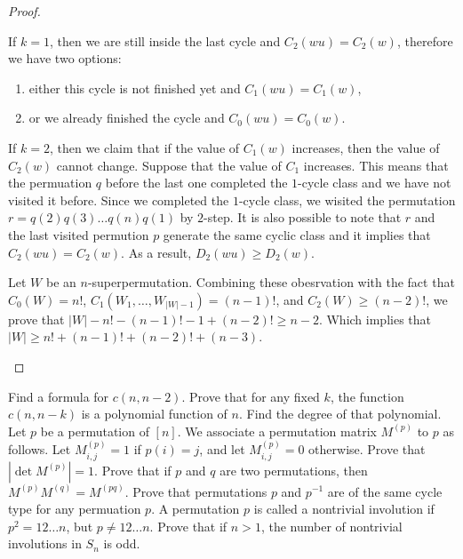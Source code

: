 \begin{proof}
\begin{itemize}
      If $k = 1$, then we are still
      inside the last cycle and $C_2(wu) = C_2(w)$, therefore we have two
      options:
      \begin{enumerate}
        \item either this cycle is not finished yet and $C_1(wu) = C_1(w)$,
        \item or we already finished the cycle and $C_0(wu) = C_0(w)$.
      \end{enumerate}

      If $k = 2$, then we claim that if the value of $C_1(w)$ increases, then
      the value of $C_2(w)$ cannot change. Suppose that the value of $C_1$
      increases. This means that the permuation $q$ before the last one
      completed the $1$-cycle class and we have not visited it before. Since we
      completed the $1$-cycle class, we wisited the permutation $r = q(2) q(3)
      \dots q(n) q(1)$ by $2$-step. It is also possible to note that $r$ and
      the last visited permution $p$ generate the same cyclic class and it
      implies that $C_2(wu) = C_2(w)$.
      As a result, $D_2(wu) \ge D_2(w)$.

      Let $W$ be an $n$-superpermutation. Combining these obesrvation with the
      fact that $C_0(W) = n!$, $C_1(W_1, \dots, W_{|W| - 1}) = (n - 1)!$, and
      $C_2(W) \ge (n - 2)!$, we prove that
      $|W| - n! - (n - 1)! - 1  + (n - 2)! \ge n - 2$. Which implies that
      $|W| \ge n! + (n - 1)! + (n - 2)! + (n - 3)$.
  \end{itemize}
\end{proof}
\begin{chapterendexercises}
  \exercise Find a formula for $c(n, n - 2)$.
  \exercise Prove that for any fixed $k$, the function $c(n, n - k)$ is a
    polynomial function of $n$. Find the degree of that polynomial.
  \exercise Let $p$ be a permutation of $[n]$. We associate a permutation matrix
    $M^{(p)}$ to $p$ as follows. Let $M^{(p)}_{i, j} = 1$ if $p(i) = j$, and let
    $M^{(p)}_{i, j} = 0$ otherwise. Prove that $|\det M^{(p)}| = 1$.
  \exercise Prove that if $p$ and $q$ are two permutations, then
    $M^{(p)} M^{(q)} = M^{(pq)}$.
  \exercise Prove that permutations $p$ and $p^{-1}$ are of the same cycle type
    for any permuation $p$.
  \exercise A permutation $p$ is called a nontrivial involution if
    $p^2 = 1 2 \dots n$, but $p \neq 12 \dots n$. Prove that if $n > 1$, the
    number of nontrivial involutions in $S_n$ is odd.
\end{chapterendexercises}
